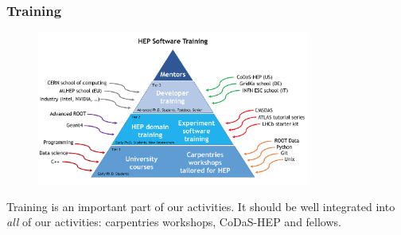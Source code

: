 \begin{frame}
\frametitle{Training}

\begin{figure}[htbp]
\begin{center}
\includegraphics[width=0.8\textwidth]{images/Training-Pyramid.png}
\end{center}
\end{figure}

\small{Training is an important part of our activities. It should be well integrated into {\em all} of our activities: carpentries workshops, CoDaS-HEP and fellows.}

\end{frame}


